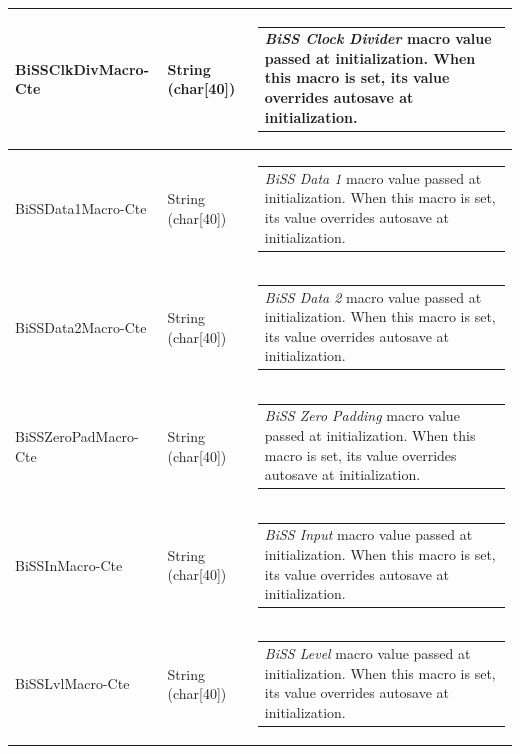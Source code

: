 \documentclass[openany]{article}
\begin{document}
\begin{longtable}{| m{4.5cm} m{2.5cm}  m{8.5cm} |}
        BiSSClkDivMacro-Cte & String (char[40]) & \begin{tabular}{@{}m{6cm}@{}}
                \emph{BiSS Clock Divider} macro value passed at initialization. When this macro is set, its value overrides autosave at initialization.
            \end{tabular} \hypertarget{pv:biss-data-1--macro-cte}{}\\ \hline
        BiSSData1Macro-Cte & String (char[40]) & \begin{tabular}{@{}m{6cm}@{}}
                \emph{BiSS Data 1} macro value passed at initialization. When this macro is set, its value overrides autosave at initialization.
            \end{tabular} \hypertarget{pv:biss-data-2-macro-cte}{}\\ \hline
        BiSSData2Macro-Cte & String (char[40]) & \begin{tabular}{@{}m{6cm}@{}}
                \emph{BiSS Data 2} macro value passed at initialization. When this macro is set, its value overrides autosave at initialization.
            \end{tabular} \hypertarget{pv:biss-zero-pad-macro-cte}{}\\ \hline
        BiSSZeroPadMacro-Cte & String (char[40]) & \begin{tabular}{@{}m{6cm}@{}}
                \emph{BiSS Zero Padding} macro value passed at initialization. When this macro is set, its value overrides autosave at initialization.
            \end{tabular} \hypertarget{pv:biss-in-macro-cte}{}\\ \hline
        BiSSInMacro-Cte & String (char[40]) & \begin{tabular}{@{}m{6cm}@{}}
                \emph{BiSS Input} macro value passed at initialization. When this macro is set, its value overrides autosave at initialization.
            \end{tabular} \hypertarget{pv:biss-lvl-macro-cte}{}\\ \hline
        BiSSLvlMacro-Cte & String (char[40]) & \begin{tabular}{@{}m{6cm}@{}}
                \emph{BiSS Level} macro value passed at initialization. When this macro is set, its value overrides autosave at initialization.
            \end{tabular} \hypertarget{}{}\\ \hline
    \end{longtable}
\end{document}
